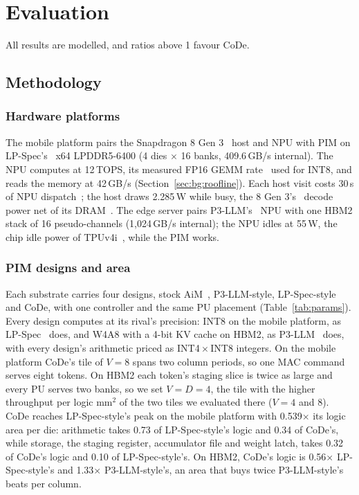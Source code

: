 \section{Evaluation}
\label{sec:eval}

All results are modelled, and ratios above 1 favour CoDe.

\subsection{Methodology}
\label{sec:eval:method}

\subsubsection{Hardware platforms}
The mobile platform pairs the Snapdragon 8 Gen 3~\cite{sd8g3} host and NPU with PIM on LP-Spec's~\cite{lpspec} x64
LPDDR5-6400 (4 dies $\times$ 16 banks, 409.6\,GB/s internal). The NPU computes at 12\,TOPS, its measured FP16 GEMM rate~\cite{hao2025}
used for INT8\ASSUMPTION, and reads the memory at 42\,GB/s (Section~\ref{sec:bg:roofline}). Each host visit costs
30\,\textmu s of NPU dispatch~\cite{npufaster}\ASSUMPTION; the host draws 2.285\,W while busy, the 8 Gen 3's~\cite{sd8g3}
decode power net of its DRAM~\cite{hao2025,heterollm,tman}\ASSUMPTION. The edge server pairs P3-LLM's~\cite{p3llm} NPU with one
HBM2 stack of 16 pseudo-channels (1,024\,GB/s internal); the NPU idles at 55\,W, the chip idle power of
TPUv4i~\cite{tpuv4i}, while the PIM works\ASSUMPTION.

\subsubsection{PIM designs and area}
Each substrate carries four designs, stock AiM~\cite{aimjssc}, P3-LLM-style, LP-Spec-style and CoDe, with one
controller and the same PU placement (Table~\ref{tab:params}). Every design computes at its rival's
precision: INT8 on the mobile platform, as LP-Spec~\cite{lpspec} does, and W4A8 with a 4-bit KV cache on HBM2, as
P3-LLM~\cite{p3llm} does, with every design's arithmetic priced as INT4\,$\times$\,INT8 integers\ASSUMPTION. On the
mobile platform CoDe's tile of $V = 8$ spans two column periods, so one MAC command serves eight tokens. On HBM2 each
token's staging slice is twice as large and every PU serves two banks, so we set $V = D = 4$, the tile with the higher
throughput per logic mm$^2$ of the two tiles we evaluated there ($V = 4$ and 8). CoDe reaches LP-Spec-style's peak on
the mobile platform with 0.539$\times$ its logic area per die: arithmetic takes 0.73 of LP-Spec-style's logic and 0.34
of CoDe's, while storage, the staging register, accumulator file and weight latch, takes 0.32 of CoDe's logic and 0.10
of LP-Spec-style's. On HBM2, CoDe's logic is 0.56$\times$ LP-Spec-style's and 1.33$\times$ P3-LLM-style's, an area
that buys twice P3-LLM-style's beats per column.

